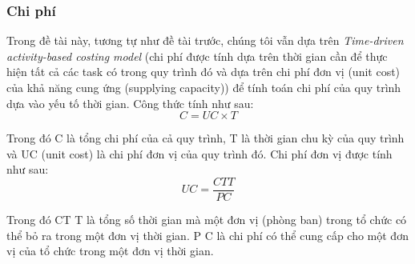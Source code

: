 \subsubsection{Chi phí}
Trong đề tài này, tương tự như đề tài trước, chúng tôi vẫn dựa trên \emph{Time-driven activity-based costing
model} (chi phí được tính dựa trên thời gian cần để thực hiện tất cả các task có trong quy trình đó và dựa trên chi phí đơn vị (unit cost) của khả năng cung ứng (supplying
capacity)) để tính toán chi phí của quy trình dựa vào yếu tố thời gian. Công thức tính như sau:
\[ C = UC \times T \]
\par
Trong đó C là tổng chi phí của cả quy trình, T là thời gian chu kỳ của quy trình và UC (unit cost) là chi phí đơn vị của quy trình đó. Chi phí đơn vị được tính như sau:
\[ UC = \frac{CTT}{PC}\]
\par
Trong đó CT T là tổng số thời gian mà một đơn vị (phòng ban) trong tổ chức có thể bỏ ra trong một đơn vị thời gian. P C là chi phí có thể cung cấp cho một đơn vị của tổ chức trong một đơn vị thời gian.